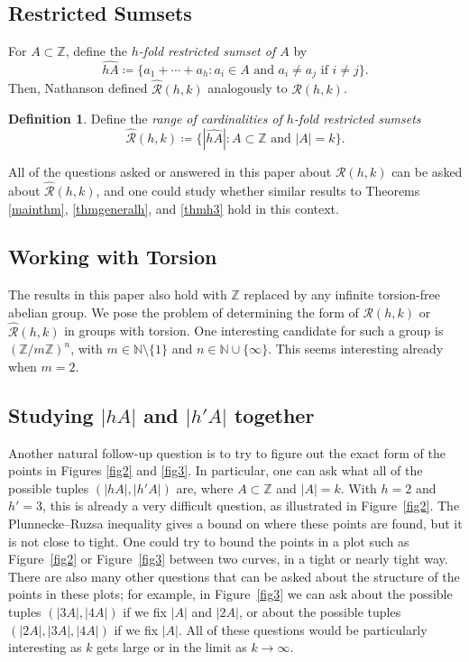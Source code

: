 \documentclass{daj}
\theoremstyle{definition}
\newtheorem{definition}[theorem]{Definition}
\theoremstyle{remark}
\numberwithin{equation}{section}
\numberwithin{theorem}{section}
\newcommand{\N}{\mathbb{N}}
\newcommand{\Z}{\mathbb{Z}}
\newcommand{\calr}{\mathcal{R}}
\begin{document}
\subsection{Restricted Sumsets}
For $A \subset \Z$, define the \emph{$h$-fold restricted sumset of $A$} by \[\widehat{hA} \coloneq  \{a_1+\cdots+a_h: a_i \in A \text{ and } a_i \neq a_j \text{ if } i \neq j \}.\] Then, Nathanson defined $\widehat{\calr}(h,k)$ analogously to $\calr(h,k)$.
\begin{definition}\cite{nathanson25Problems}
      Define the \emph{range of cardinalities of $h$-fold restricted sumsets } \[\widehat{\calr}(h,k)\coloneq  \{|\widehat{hA}|:A \subset \Z \text{ and } |A| = k\}.\]
\end{definition}
All of the questions asked or answered in this paper about $\calr(h,k)$ can be asked about $\widehat{\calr}(h,k)$, and one could study whether similar results to Theorems \ref{mainthm}, \ref{thmgeneralh}, and \ref{thmh3} hold in this context.
\subsection{Working with Torsion}
The results in this paper also hold with $\Z$ replaced by any infinite torsion-free abelian group. We pose the problem of determining the form of $\calr(h,k)$ or $\widehat{\calr}(h,k)$ in groups with torsion. One interesting candidate for such a group is $(\Z/m\Z)^n$, with $m \in \N \setminus \{1\}$ and $n \in \N \cup \{\infty\}$. This seems interesting already when $m = 2$.


\subsection{Studying \texorpdfstring{$|hA|$}{|hA|} and \texorpdfstring{$|h'A|$}{|h'A|} together}
Another natural follow-up question is to try to figure out the exact form of the points in Figures \ref{fig2} and \ref{fig3}. In particular, one can ask what all of the possible tuples $(|hA|,|h'A|)$ are, where $A \subset \Z$ and $|A| = k$. With $h = 2$ and $h' = 3$, this is already a very difficult question, as illustrated in Figure~\ref{fig2}. The Plunnecke--Ruzsa \cite{Plunnecke70,Ruzsa89} inequality gives a bound on where these points are found, but it is not close to tight. One could try to bound the points in a plot such as Figure~\ref{fig2} or Figure~\ref{fig3} between two curves, in a tight or nearly tight way. There are also many other questions that can be asked about the structure of the points in these plots; for example, in Figure~\ref{fig3} we can ask about the possible tuples $(|3A|,|4A|)$ if we fix $|A|$ and $|2A|$, or about the possible tuples $(|2A|,|3A|,|4A|)$ if we fix $|A|$. All of these questions would be particularly interesting as $k$ gets large or in the limit as $k \to \infty$. 
\end{document}
